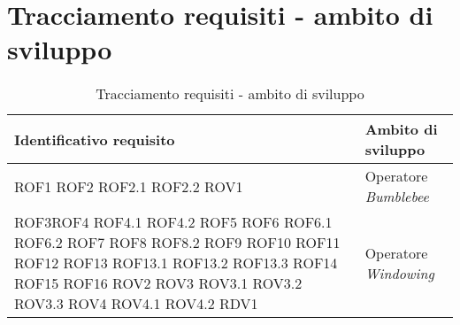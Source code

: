 \section{Tracciamento requisiti - ambito di sviluppo}
{
\centering
\begin{longtable}{L{5cm} L{8.5cm}}
\caption{Tracciamento requisiti - ambito di sviluppo}\\
\textbf{Identificativo requisito} &
\textbf{Ambito di sviluppo}\\
\endhead
\hline

ROF1 \newline ROF2 \newline ROF2.1 \newline ROF2.2 \newline ROV1 & Operatore \textit{Bumblebee} \\
\hline
ROF3\newline ROF4 \newline ROF4.1 \newline ROF4.2 \newline ROF5 \newline ROF6 \newline ROF6.1 \newline ROF6.2 \newline ROF7 \newline ROF8 \newline ROF8.2 \newline ROF9 \newline ROF10 \newline ROF11 \newline ROF12 \newline ROF13 \newline ROF13.1 \newline ROF13.2 \newline ROF13.3 \newline ROF14 \newline ROF15 \newline ROF16 \newline ROV2 \newline ROV3 \newline ROV3.1 \newline ROV3.2 \newline ROV3.3 \newline ROV4 \newline ROV4.1 \newline ROV4.2 \newline RDV1 & Operatore \textit{Windowing} \\

\end{longtable}}
